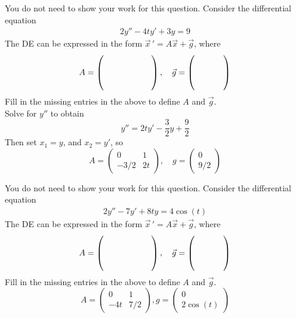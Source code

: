 \ifnum {}
    \question[2] You do not need to show your work for this question. Consider the differential equation 
    \begin{align*}
        2y'' - 4ty' + 3y = 9
    \end{align*}
    The DE can be expressed in the form $\vec x\, ' = A\vec x + \vec g$, where 
    \begin{align*}
     A = \left( \hbox to 2cm{\vbox to 0.85cm{}} \right), \quad \vec g = \left( \hbox to 1.2cm{\vbox to 0.85cm{}} \right)
    \end{align*}
    Fill in the missing entries in the above to define $A$ and $\vec g$. 
    \ifnum {} {\color{DarkBlue} \\[12pt] 
    Solve for $y''$ to obtain
    $$y'' = 2ty'-\frac32y+\frac92$$
    Then set $x_1 = y$, and $x_2 = y'$, so
    $$A = \begin{pmatrix} 0&1\\-3/2&2t\end{pmatrix}, \quad g = \begin{pmatrix} 0\\9/2\end{pmatrix}$$
    } 
    \else 
    \fi    
\fi



\ifnum {}
    \question[2] You do not need to show your work for this question. Consider the differential equation 
    \begin{align*}
        2y'' - 7y' + 8ty = 4\cos(t)
    \end{align*}
    The DE can be expressed in the form $\vec x\, ' = A\vec x + \vec g$, where 
    \begin{align*}
     A = \left( \hbox to 2cm{\vbox to 0.85cm{}} \right), \quad \vec g = \left( \hbox to 1.2cm{\vbox to 0.85cm{}} \right)
    \end{align*}
    Fill in the missing entries in the above to define $A$ and $\vec g$. 
    \ifnum {} {\color{DarkBlue} \\[12pt] 
    $$A = \begin{pmatrix} 0&1\\-4t& 7/2\end{pmatrix}, g = \begin{pmatrix} 0\\2\cos(t)\end{pmatrix}$$
    } 
    \else 
    \fi    
\fi



